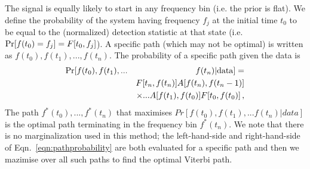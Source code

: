 \documentclass[paper-main.tex]{subfiles}
\begin{document}
The signal is equally likely to start in any frequency bin (i.e. the prior is flat). 
We define the probability of the system having frequency $f_j$ at the initial time $t_0$ to be equal to the (normalized) detection statistic at that state (i.e.\  ${\rm Pr}[f(t_0) = f_j] = F[t_0,f_j]$).
A specific path (which may not be optimal) is written as $f(t_0), f(t_1),..., f(t_n)$. 
The probability of a specific path given the data is 
\begin{eqnarray}
{\rm Pr}[ f(t_0), f(t_1),... && f(t_n) | {\rm data}] = \nonumber\\
          && F[t_n,f(t_n)] A[f(t_n),f(t_n-1)] \nonumber \\
          && \times... A[f(t_1),f(t_0)] F[t_0,f(t_0)] \,,
\label{eqn:pathprobability}
\end{eqnarray}
The path $f^\ast(t_0),...,f^\ast(t_n)$ that maximises $Pr[ f(t_0), f(t_1),... f(t_n) | data]$ is the optimal path terminating in the frequency bin $f^\ast(t_n)$. 
We note that there is no marginalization used in this method; the left-hand-side and right-hand-side of Eqn.~\ref{eqn:pathprobability} are both evaluated for a specific path and then we mazimise over all such paths to find the optimal Viterbi path. 
\end{document}
